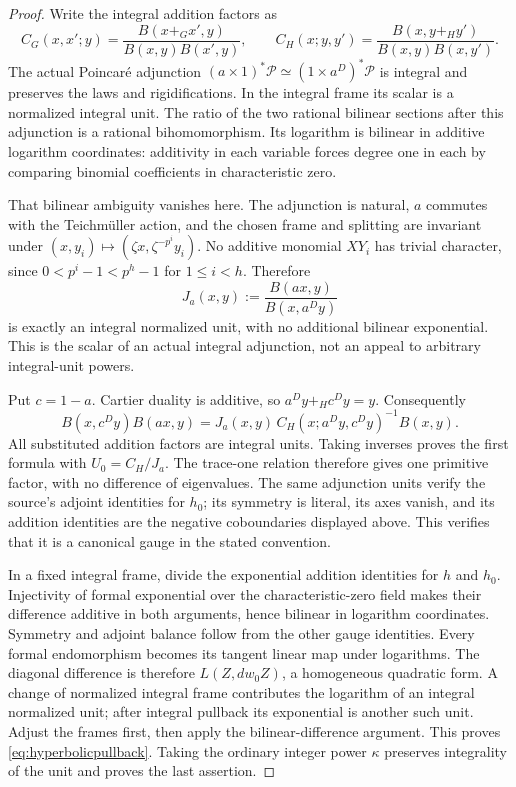 \begin{proof}
Write the integral addition factors as
\[
 C_G(x,x';y)=\frac{B(x+_Gx',y)}{B(x,y)B(x',y)},\qquad
 C_H(x;y,y')=\frac{B(x,y+_Hy')}{B(x,y)B(x,y')}.
\]
The actual Poincar\'e adjunction
$(a\times1)^*\mathcal P\simeq(1\times a^D)^*\mathcal P$
is integral and preserves the laws and rigidifications. In the integral frame its scalar is a normalized integral unit.
The ratio of the two rational bilinear sections after this adjunction is a rational bihomomorphism. Its logarithm is bilinear in additive logarithm coordinates: additivity in each variable forces degree one in each by comparing binomial coefficients in characteristic zero.

That bilinear ambiguity vanishes here. The adjunction is natural, $a$ commutes with the Teichm\"uller action, and the chosen frame and splitting are invariant under
$(x,y_i)\mapsto(\zeta x,\zeta^{-p^i}y_i)$.
No additive monomial $XY_i$ has trivial character, since
$0<p^i-1<p^h-1$ for $1\le i<h$.
Therefore
\[
 J_a(x,y):=\frac{B(ax,y)}{B(x,a^Dy)}
\]
is exactly an integral normalized unit, with no additional bilinear exponential.
This is the scalar of an actual integral adjunction, not an appeal to arbitrary integral-unit powers.

Put $c=1-a$. Cartier duality is additive, so
$a^Dy+_Hc^Dy=y$. Consequently
\[
 B(x,c^Dy)B(ax,y)
 =J_a(x,y)\,C_H(x;a^Dy,c^Dy)^{-1}B(x,y).
\]
All substituted addition factors are integral units. Taking inverses proves the first formula with $U_0=C_H/J_a$.
The trace-one relation therefore gives one primitive factor, with no difference of eigenvalues.
The same adjunction units verify the source's adjoint identities for $h_0$; its symmetry is literal, its axes vanish, and its addition identities are the negative coboundaries displayed above. This verifies that it is a canonical gauge in the stated convention.

In a fixed integral frame, divide the exponential addition identities for $h$ and $h_0$. Injectivity of formal exponential over the characteristic-zero field makes their difference additive in both arguments, hence bilinear in logarithm coordinates.
Symmetry and adjoint balance follow from the other gauge identities.
Every formal endomorphism becomes its tangent linear map under logarithms. The diagonal difference is therefore $L(Z,dw_0Z)$, a homogeneous quadratic form.
A change of normalized integral frame contributes the logarithm of an integral normalized unit; after integral pullback its exponential is another such unit. Adjust the frames first, then apply the bilinear-difference argument. This proves \eqref{eq:hyperbolicpullback}. Taking the ordinary integer power $\kappa$ preserves integrality of the unit and proves the last assertion.
\end{proof}

